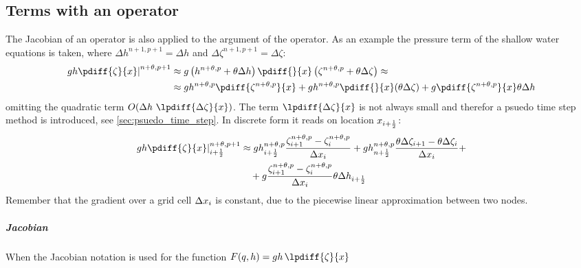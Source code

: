 \subsection{Terms with an operator}\label{sec:jacobians_with_operator}
The Jacobian of an operator is also applied to the argument of the operator.
As an example the pressure term of the shallow water equations is taken, where $\Delta h^{n+1, p+1} = \Delta h$ and  $\Delta \zeta^{n+1, p+1} = \Delta \zeta$:
\begin{align}
    \left. gh \pdiff{\zeta}{x}\right|^{n+\theta, p+1} & \approx g \left( h^{n+\theta, p} + \theta \Delta h \right) \pdiff{}{x} \left( \zeta^{n+\theta, p} + \theta\Delta \zeta  \right) \approx
    \\
    & \approx g h^{n+\theta, p} \pdiff{\zeta^{n+\theta, p}}{x}
    +  gh^{n+\theta, p} \pdiff{}{x} (\theta\Delta \zeta)
    +  g \pdiff{\zeta^{n+\theta, p}}{x} \theta\Delta h
\end{align}
omitting the quadratic  term $O(\Delta h\ \lpdiff{\Delta \zeta}{x})$.
The term  $\lpdiff{\Delta \zeta}{x}$ is not always small and therefor a psuedo time step method is introduced, see \autoref{sec:psuedo_time_step}.
In discrete form it reads on location $x_{i+\frac{1}{2}}$:
\begin{align}
    \left. gh \pdiff{\zeta}{x}\right|^{n+\theta, p+1}_{i+\half} & \approx g h^{n+\theta, p}_{i+\half} \frac{\zeta^{n+\theta, p}_{i+1} - \zeta^{n+\theta, p}_{i}}{\Dx_{i}}
    + gh^{n+\theta, p}_{n+\half} \frac{\theta \Delta \zeta_{i+1} - \theta \Delta \zeta_{i}}{\Dx_{i}} +
    \\
    & \quad
    + g \frac{\zeta^{n+\theta, p}_{i+1} - \zeta^{n+\theta, p}_{i}}{\Dx_{i}} \theta \Delta h_{i+\half}
\end{align}
Remember that the gradient over a grid cell $\Delta x_i$ is constant, due to the piecewise linear approximation between two nodes.
\subparagraph*{Jacobian}
When the Jacobian notation is  used for the function $F(q,h) = gh\, \lpdiff{\zeta}{x}$
